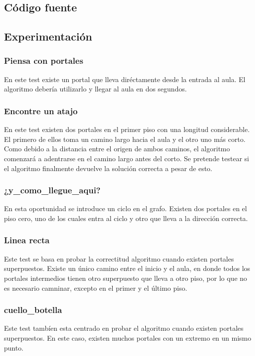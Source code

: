 \subsection{Código fuente}

\subsection{Experimentación}
\subsubsection{Piensa con portales}
En este test existe un portal que lleva diréctamente desde la entrada al aula. El algoritmo debería utilizarlo y llegar al aula en dos segundos.

\subsubsection{Encontre un atajo}
En este test existen dos portales en el primer piso con una longitud considerable. El primero de ellos toma un camino largo hacia el aula y el otro uno más corto. Como debido a la distancia entre el origen de ambos caminos, el algoritmo comenzará a adentrarse en el camino largo antes del corto. Se pretende testear si el algoritmo finalmente devuelve la solución correcta a pesar de esto.

\subsubsection{¿y_como_llegue_aqui?}
En esta oportunidad se introduce un ciclo en el grafo. Existen dos portales en el piso cero, uno de los cuales entra al ciclo y otro que lleva a la dirección correcta.

\subsubsection{Linea recta}
Este test se basa en probar la correctitud algoritmo cuando existen portales superpuestos. Existe un único camino entre el inicio y el aula, en donde todos los portales intermedios tienen otro superpuesto que lleva a otro piso, por lo que no es necesario camninar, excepto en el primer y el último piso.

\subsubsection{cuello_botella}
Este test tambíen esta centrado en probar el algoritmo cuando existen portales superpuestos. En este caso, existen muchos portales con un extremo en un mismo punto.

